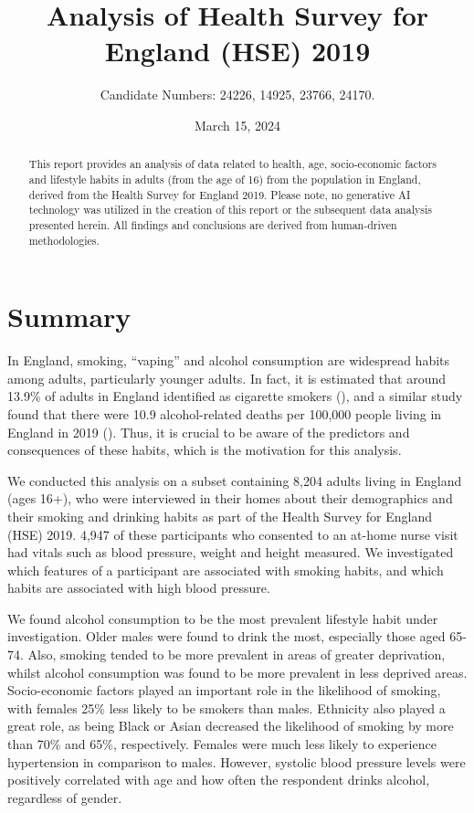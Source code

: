 \documentclass[
  11pt,
  twocolumn]{article}
\title{Analysis of Health Survey for England (HSE) 2019}
\author{Candidate Numbers: 24226, 14925, 23766, 24170.}
\date{March 15, 2024}
\begin{document}
\maketitle
\begin{abstract}
This report provides an analysis of data related to health, age,
socio-economic factors and lifestyle habits in adults (from the age of
16) from the population in England, derived from the Health Survey for
England 2019. Please note, no generative AI technology was utilized in
the creation of this report or the subsequent data analysis presented
herein. All findings and conclusions are derived from human-driven
methodologies.
\end{abstract}


\clearpage

\section{Summary}\label{summary}

In England, smoking, ``vaping'' and alcohol consumption are widespread
habits among adults, particularly younger adults. In fact, it is
estimated that around 13.9\% of adults in England identified as
cigarette smokers (), and a similar study
found that there were 10.9 alcohol-related deaths per 100,000 people
living in England in 2019 (). Thus, it is
crucial to be aware of the predictors and consequences of these habits,
which is the motivation for this analysis.

We conducted this analysis on a subset containing 8,204 adults living in
England (ages 16+), who were interviewed in their homes about their
demographics and their smoking and drinking habits as part of the Health
Survey for England (HSE) 2019. 4,947 of these participants who consented
to an at-home nurse visit had vitals such as blood pressure, weight and
height measured. We investigated which features of a participant are
associated with smoking habits, and which habits are associated with
high blood pressure.

We found alcohol consumption to be the most prevalent lifestyle habit
under investigation. Older males were found to drink the most,
especially those aged 65-74. Also, smoking tended to be more prevalent
in areas of greater deprivation, whilst alcohol consumption was found to
be more prevalent in less deprived areas. Socio-economic factors played
an important role in the likelihood of smoking, with females 25\% less
likely to be smokers than males. Ethnicity also played a great role, as
being Black or Asian decreased the likelihood of smoking by more than
70\% and 65\%, respectively. Females were much less likely to experience
hypertension in comparison to males. However, systolic blood pressure
levels were positively correlated with age and how often the respondent
drinks alcohol, regardless of gender.
\end{document}
